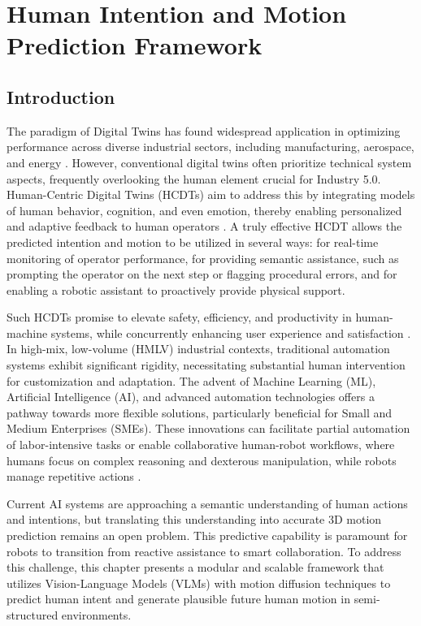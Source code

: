\chapter{Human Intention and Motion Prediction Framework}
\label{chap:framework}

\section{Introduction}

The paradigm of Digital Twins has found widespread application in optimizing performance across diverse industrial sectors, including manufacturing, aerospace, and energy \citep{Andronas2021, Polini2020}. However, conventional digital twins often prioritize technical system aspects, frequently overlooking the human element crucial for Industry 5.0. Human-Centric Digital Twins (HCDTs) aim to address this by integrating models of human behavior, cognition, and even emotion, thereby enabling personalized and adaptive feedback to human operators \citep{Usman}. A truly effective HCDT allows the predicted intention and motion to be utilized in several ways: for real-time monitoring of operator performance, for providing semantic assistance, such as prompting the operator on the next step or flagging procedural errors, and for enabling a robotic assistant to proactively provide physical support.

Such HCDTs promise to elevate safety, efficiency, and productivity in human-machine systems, while concurrently enhancing user experience and satisfaction \citep{Umbrico2022}. In high-mix, low-volume (HMLV) industrial contexts, traditional automation systems exhibit significant rigidity, necessitating substantial human intervention for customization and adaptation. The advent of Machine Learning (ML), Artificial Intelligence (AI), and advanced automation technologies offers a pathway towards more flexible solutions, particularly beneficial for Small and Medium Enterprises (SMEs). These innovations can facilitate partial automation of labor-intensive tasks or enable collaborative human-robot workflows, where humans focus on complex reasoning and dexterous manipulation, while robots manage repetitive actions \citep{Cotta2023, Sirintuna2024}.

Current AI systems are approaching a semantic understanding of human actions and intentions, but translating this understanding into accurate 3D motion prediction remains an open problem. This predictive capability is paramount for robots to transition from reactive assistance to smart collaboration. To address this challenge, this chapter presents a modular and scalable framework that utilizes Vision-Language Models (VLMs) with motion diffusion techniques to predict human intent and generate plausible future human motion in semi-structured environments.

